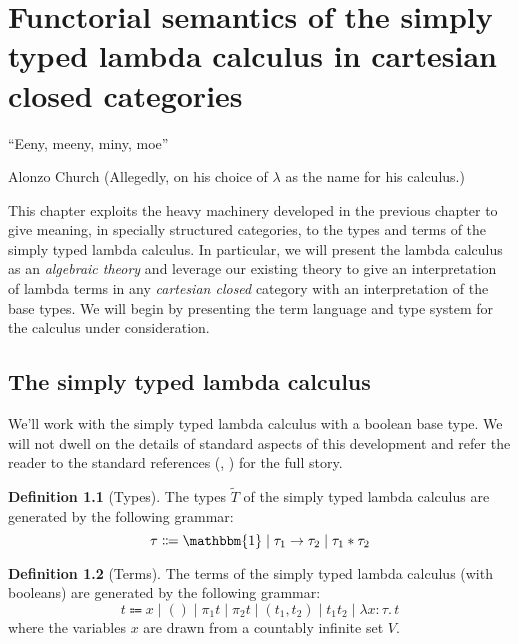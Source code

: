 \documentclass[12pt,twoside]{reedthesis}
\theoremstyle{definition}
\newtheorem{definition}{Definition}
\theoremstyle{remark}
\theoremstyle{plain}
\begin{document}
\chapter{Functorial semantics of the simply typed lambda calculus in cartesian closed categories}
\epigraph{``Eeny, meeny, miny, moe''}{Alonzo Church (Allegedly, on his choice of
  $\lambda$ as the name for his calculus.)}

This chapter exploits the heavy machinery developed in the previous chapter to
give meaning, in specially structured categories, to the types and terms of the
simply typed lambda calculus. In particular, we will present the lambda calculus
as an \emph{algebraic theory} and leverage our existing theory to give an
interpretation of lambda terms in any \emph{cartesian closed} category with an
interpretation of the base types. We will begin by presenting the term language
and type system for the calculus under consideration.

\section{The simply typed lambda calculus}
We'll work with the simply typed lambda calculus with a boolean base type. We
will not dwell on the details of standard aspects of this development and refer
the reader to the standard references (\cite{pierce_types_2002},
\cite{harper_practical_2016}) for the full story.

\newcommand{\termob}{\mathbbm{1}}
\newcommand{\bool}{\mathbb{B}}

\begin{definition}[Types]
  The types \( \widetilde{T} \) of the simply typed lambda calculus are
  generated by the following grammar:
  \[
    \tau \Coloneqq \termob \mid \tau_{1} \rightarrow \tau_{2} \mid \tau_{1} * \tau_{2}
  \]
\end{definition}

\newcommand{\abstr}[3]{\lambda #1 : #2.\, #3}

\begin{definition}[Terms]
  The terms of the simply typed lambda calculus (with booleans) are generated by the
  following grammar:
  \[
    t \Coloneq x \mid () \mid \pi_{1} t \mid \pi_{2} t \mid (t_{1}, t_{2}) \mid t_{1} t_{2} \mid \abstr{x}{\tau}{t}
  \]
  where the variables $x$ are drawn from a countably infinite set \( V \).
\end{definition}
\end{document}
